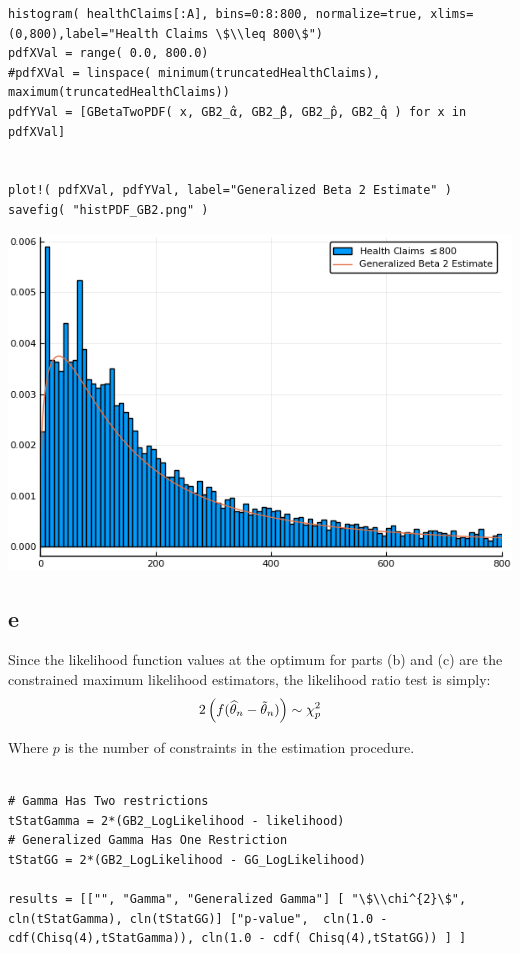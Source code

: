 \documentclass[12pt, letterpaper]{paper}
\begin{document}
\begin{verbatim}
histogram( healthClaims[:A], bins=0:8:800, normalize=true, xlims=(0,800),label="Health Claims \$\\leq 800\$")
pdfXVal = range( 0.0, 800.0)
#pdfXVal = linspace( minimum(truncatedHealthClaims), maximum(truncatedHealthClaims))
pdfYVal = [GBetaTwoPDF( x, GB2_̂α, GB2_̂β, GB2_̂p, GB2_̂q ) for x in pdfXVal]


plot!( pdfXVal, pdfYVal, label="Generalized Beta 2 Estimate" )
savefig( "histPDF_GB2.png" )
\end{verbatim}

\begin{center}
\includegraphics[width=.9\linewidth]{histPDF_GB2.png}
\end{center}

\subsection{e}
\label{sec:org37d2ff9}
Since the likelihood function values at the optimum for parts (b) and
(c) are the constrained maximum likelihood estimators, the likelihood
ratio test is simply: 
\begin{equation*}
  2 \left( f( \widehat{ \theta }_{n} - \tilde{ \theta }_{n}) \right) \sim \chi_{p}^{2}
\end{equation*}

Where \(p\) is the number of constraints in the estimation procedure. 
\begin{verbatim}

# Gamma Has Two restrictions
tStatGamma = 2*(GB2_LogLikelihood - likelihood)
# Generalized Gamma Has One Restriction
tStatGG = 2*(GB2_LogLikelihood - GG_LogLikelihood)

results = [["", "Gamma", "Generalized Gamma"] [ "\$\\chi^{2}\$", cln(tStatGamma), cln(tStatGG)] ["p-value",  cln(1.0 - cdf(Chisq(4),tStatGamma)), cln(1.0 - cdf( Chisq(4),tStatGG)) ] ]
\end{verbatim}
\end{document}
